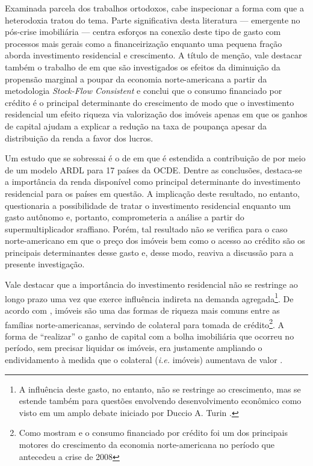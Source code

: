 Examinada parcela dos trabalhos ortodoxos, cabe inspecionar a forma com que a heterodoxia tratou do tema. 
Parte significativa desta literatura  --- emergente no pós-crise imobiliária --- centra esforços na conexão deste tipo de gasto com processos mais gerais como a financeirização \cites{aalbers_financialization_2008}{bibow_financialization_2010} enquanto uma pequena fração aborda investimento residencial e crescimento.
A título de menção, vale destacar também o trabalho de \textcite{zezza_u.s._2008} em que são investigados os efeitos da diminuição da propensão marginal a poupar da economia norte-americana a partir da metodologia \textit{Stock-Flow Consistent} e conclui que o consumo financiado por crédito é o principal determinante do crescimento de modo que o investimento residencial um efeito riqueza via valorização dos imóveis apenas em que os ganhos de capital ajudam a explicar a redução na taxa de poupança apesar da distribuição da renda a favor dos lucros. 

Um estudo que se sobressai é o de \textcite{arestis_residential_2015} em que é estendida a contribuição de \textcite{poterba_tax_1984} por meio de um modelo ARDL para 17 países da OCDE. Dentre as conclusões, destaca-se a importância da renda disponível como principal determinante do investimento residencial para os países em questão.  A implicação deste resultado, no entanto, questionaria a possibilidade de tratar o investimento residencial enquanto um gasto autônomo e, portanto, comprometeria a análise a partir do supermultiplicador sraffiano. Porém, tal resultado não se verifica para o caso norte-americano em que o preço dos imóveis bem como o acesso ao crédito são os principais determinantes desse gasto e, desse modo, reaviva a discussão para a presente investigação.

Vale destacar que a importância do investimento residencial não se restringe ao longo prazo uma vez que exerce influência indireta na demanda agregada\footnote{
	A influência deste gasto, no entanto, não se restringe ao crescimento, mas se estende também para questões envolvendo desenvolvimento econômico como visto em um amplo debate iniciado por Duccio A. Turin \cite{pheng_revisit_1992}.}. 
De acordo com \textcite{teixeira_uma_2011}, imóveis são uma das formas de riqueza mais comuns entre as famílias norte-americanas, servindo de colateral para tomada de crédito\footnote{Como mostram \textcite{zezza_u.s._2008} e \textcite{barba_rising_2009} o consumo financiado por crédito foi um dos principais motores do crescimento da economia norte-americana no período que antecedeu a crise de 2008}. A forma de ``realizar'' o ganho de capital com a bolha imobiliária que ocorreu no período, sem precisar liquidar os imóveis, era justamente ampliando o endividamento à medida que o colateral (\textit{i.e.} imóveis) aumentava de valor \cite{teixeira_crescimento_2015}. 

